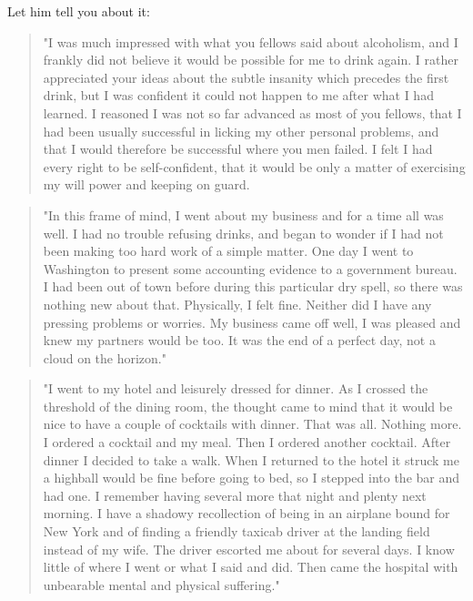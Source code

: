 \begin{biblechapter}

Let him tell you about it: 

\begin{quote}
"I was much impressed with what you fellows said about alcoholism, 
and I frankly did not believe it would be possible for me to drink again. 
I rather appreciated your ideas about the subtle insanity which precedes the first drink, 
but I was confident it could not happen to me after what I had learned. 
I reasoned I was not so far advanced as most of you fellows, 
that I had been usually successful in licking my other personal problems, 
and that I would therefore be successful where you men failed. 
I felt I had every right to be self-confident, 
that it would be only a matter of exercising my will power and keeping on guard.
\end{quote}

\begin{quote}
"In this frame of mind, I went about my business and for a time all was well. 
I had no trouble refusing drinks, 
and began to wonder if I had not been making too hard work of a simple matter. 
One day I went to Washington to present some accounting evidence to a government bureau. 
I had been out of town before during this particular dry spell, 
so there was nothing new about that. 
Physically, I felt fine. 
Neither did I have any pressing problems or worries. 
My business came off well, I was pleased and knew my partners would be too. 
It was the end of a perfect day, not a cloud on the horizon."
\end{quote}


\begin{quote}
"I went to my hotel and leisurely dressed for dinner. 
As I crossed the threshold of the dining room, 
the thought came to mind that it would be nice to have a couple of cocktails with dinner. 
That was all. 
Nothing more. 
I ordered a cocktail and my meal. 
Then I ordered another cocktail. 
After dinner I decided to take a walk. 
When I returned to the hotel it struck me a highball would be fine before going to bed, 
so I stepped into the bar and had one. 
I remember having several more that night and plenty next morning. 
I have a shadowy recollection of being in an airplane bound for New York 
and of finding a friendly taxicab driver at the landing field instead of my wife. 
The driver escorted me about for several days. 
I know little of where I went or what I said and did. 
Then came the hospital with unbearable mental and physical suffering."
\end{quote}



\end{biblechapter}
